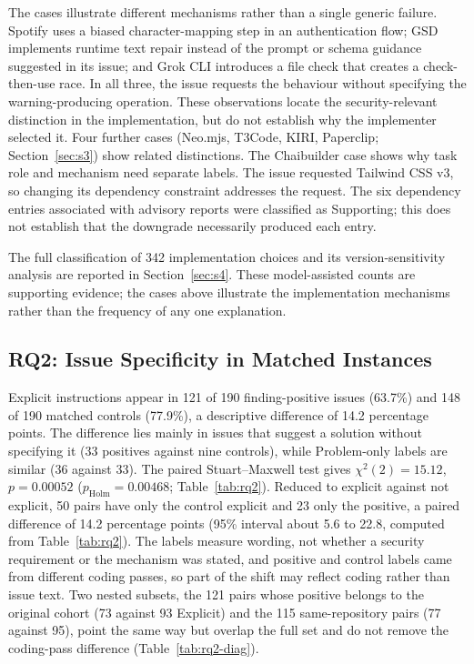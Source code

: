 \documentclass[acmsmall,screen,nonacm]{acmart}
\begin{document}
The cases illustrate different mechanisms rather than a single generic failure. Spotify uses a biased character-mapping step in an authentication flow; GSD implements runtime text repair instead of the prompt or schema guidance suggested in its issue; and Grok CLI introduces a file check that creates a check-then-use race. In all three, the issue requests the behaviour without specifying the warning-producing operation. These observations locate the security-relevant distinction in the implementation, but do not establish why the implementer selected it. Four further cases (Neo.mjs, T3Code, KIRI, Paperclip; Section~\ref{sec:s3}) show related distinctions. The Chaibuilder case shows why task role and mechanism need separate labels. The issue requested Tailwind CSS v3, so changing its dependency constraint addresses the request. The six dependency entries associated with advisory reports were classified as Supporting; this does not establish that the downgrade necessarily produced each entry.

The full classification of 342 implementation choices and its version-sensitivity analysis are reported in Section~\ref{sec:s4}. These model-assisted counts are supporting evidence; the cases above illustrate the implementation mechanisms rather than the frequency of any one explanation.

\subsection{RQ2: Issue Specificity in Matched Instances}\label{sec:rq2-res}

Explicit instructions appear in 121 of 190 finding-positive issues (63.7\%) and 148 of 190 matched controls (77.9\%), a descriptive difference of 14.2 percentage points. The difference lies mainly in issues that suggest a solution without specifying it (33 positives against nine controls), while Problem-only labels are similar (36 against 33). The paired Stuart--Maxwell test gives $\chi^2(2)=15.12$, $p=0.00052$ ($p_{\mathrm{Holm}}=0.00468$; Table~\ref{tab:rq2}). Reduced to explicit against not explicit, 50 pairs have only the control explicit and 23 only the positive, a paired difference of 14.2 percentage points (95\% interval about 5.6 to 22.8, computed from Table~\ref{tab:rq2}). The labels measure wording, not whether a security requirement or the mechanism was stated, and positive and control labels came from different coding passes, so part of the shift may reflect coding rather than issue text. Two nested subsets, the 121 pairs whose positive belongs to the original cohort (73 against 93 Explicit) and the 115 same-repository pairs (77 against 95), point the same way but overlap the full set and do not remove the coding-pass difference (Table~\ref{tab:rq2-diag}).
\end{document}
